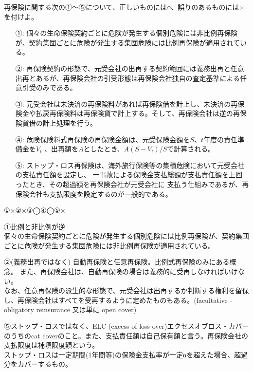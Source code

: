 \documentclass[report,gutter=10mm,fore-edge=10mm,uplatex,dvipdfmx]{jlreq}
\begin{document}
再保険に関する次の①～⑤について、正しいものには○、誤りのあるものには×を付けよ。

\begin{itemize}
\item[ ①: ] 個々の生命保険契約ごとに危険が発生する個別危険には非比例再保険が、契約集団ごとに危険が発生する集団危険には比例再保険が適用されている。
\item[ ②: ] 再保険契約の形態で、元受会社の出再する契約範囲には義務出再と任意出再とあるが、再保険会社の引受形態は再保険会社独自の査定基準による任意引受のみである。
\item[ ③: ] 元受会社は未決済の再保険料があれば再保険借を計上し、未決済の再保険金や払戻再保険料は再保険貸で計上する。そして、再保険会社は逆の再保険貸借の計上処理を行う。
\item[ ④: ] 危険保険料式再保険の再保険金額は、元受保険金額を$S$、$t$年度の責任準備金を$V_t$ 、出再額を$A$としたとき、$A(S-V_t)/S$で計算される。
\item[ ⑤: ] ストップ・ロス再保険は、海外旅行保険等の集積危険において元受会社の支払責任額を設定し、
 一事故による保険金支払総額が支払責任額を上回ったとき、その超過額を再保険会社が元受会社に
 支払う仕組みであるが、再保険会社も支払限度を設定するのが一般的である。
\end{itemize}
\answer{}
①×②×③◯④◯⑤×

①比例と非比例が逆\\
個々の生命保険契約ごとに危険が発生する個別危険には比例再保険が、契約集団ごとに危険が発生する集団危険には非比例再保険が適用されている。

②(義務出再ではなく) 自動再保険と任意再保険。比例式再保険のみにある概念。
また、再保険会社は、自動再保険の場合は義務的に受再しなければいけない。\\
なお、任意再保険の派生的な形態で、元受会社は出再するか判断する権利を留保し、再保険会社はすべてを受再するように定めたものもある。(facultative - obligatory reinsurance 又は単に open cover)

⑤ストップ・ロスではなく、ELC (excess of loss over)エクセスオブロス・カバーのうちのcat coverのこと。また、支払責任額は自己保有額と言う。再保険会社の支払限度は補填限度額という。\\
ストップ・ロスは一定期間(1年間等)の保険金支払率が一定αを超えた場合、超過分をカバーするもの。
\end{document}
